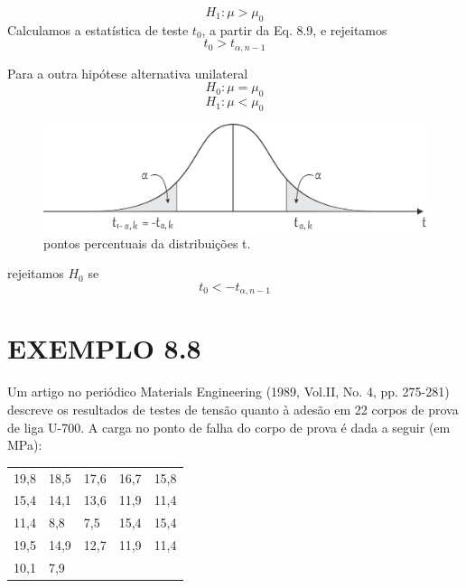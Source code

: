 \documentclass[a4paper,12pt]{article} %
\begin{document}
	\begin{equation}
		\tag{8.42}
		H_1: \mu > \mu_0
	\end{equation}
	Calculamos a estatística de teste $t_0$, a partir da Eq. 8.9, e rejeitamos %
	\begin{equation}
		\tag{8.43}
		t_0 >  t_{\alpha, n-1}
	\end{equation}

	Para a outra hipótese alternativa unilateral
	\begin{equation*}
		H_0: \mu = \mu_0
	\end{equation*}
	\begin{equation}
		\tag{8.44}
		H_1: \mu < \mu_0
	\end{equation}

	\begin{figure}[H]
		\centering
		\includegraphics[width=0.7\linewidth]{fig2}
		\caption[]{pontos percentuais da distribuições t.}
	
	\end{figure}

	rejeitamos $H_0$ se
	\begin{equation}
		\tag{8.45}
		t_0 < -t_{\alpha, n-1}
	\end{equation}

	\section*{EXEMPLO 8.8}
	Um artigo no periódico Materials Engineering (1989, Vol.II, No. 4, pp. 275-281) descreve os resultados de testes de tensão quanto à adesão em 22 corpos de prova de liga U-700. A carga no ponto de falha do corpo de prova é dada a seguir (em MPa):
	\begin{table}[H]
		\centering
		\begin{tabular}{lllll}
			\hline
			19,8 & 18,5 & 17,6 & 16,7 & 15,8 \\
			15,4 & 14,1 & 13,6 & 11,9 & 11,4 \\
			11,4 & 8,8  & 7,5  & 15,4 & 15,4 \\
			19,5 & 14,9 & 12,7 & 11,9 & 11,4 \\
			10,1 & 7,9  &      &      &      \\ 
			
			\hline
		\end{tabular}
	\end{table}
\end{document}
